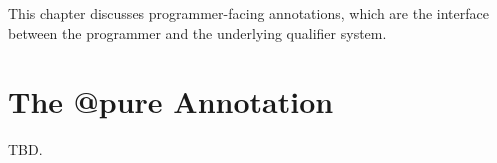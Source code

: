 This chapter discusses programmer-facing annotations,
which are the interface between the programmer and the underlying
qualifier system.

\section{The @pure Annotation}
TBD.
